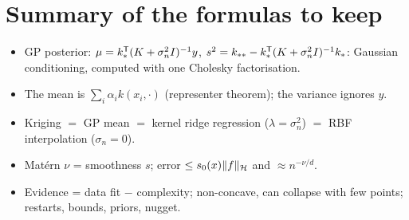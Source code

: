 \section*{Summary of the formulas to keep}
\begin{itemize}[nosep]
  \item GP posterior: $\mu = k_*^{\mathsf{T}}(K + \sigma_n^2 I)^{-1}y$, $s^2 = k_{**} - k_*^{\mathsf{T}}(K + \sigma_n^2 I)^{-1}k_*$: Gaussian
        conditioning, computed with one Cholesky factorisation.
  \item The mean is $\sum_i \alpha_i k(x_i, \cdot)$ (representer theorem); the variance ignores $y$.
  \item Kriging $=$ GP mean $=$ kernel ridge regression ($\lambda = \sigma_n^2$) $=$ RBF interpolation
        ($\sigma_n = 0$).
  \item Mat\'ern $\nu$ = smoothness $s$; error $\le s_0(x)\lVert f\rVert_{\mathcal{H}}$ and $\approx n^{-\nu/d}$.
  \item Evidence = data fit $-$ complexity; non-concave, can collapse with few points; restarts, bounds, priors,
        nugget.
\end{itemize}
